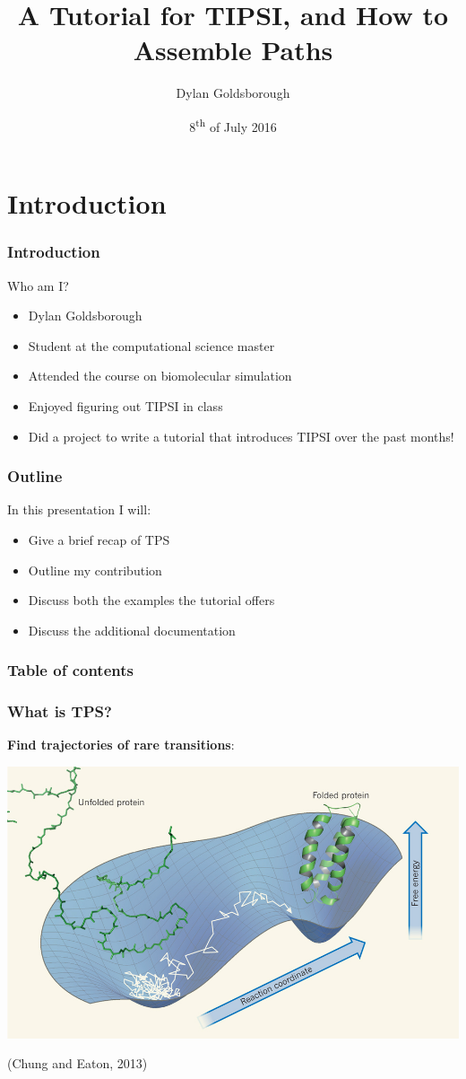 \documentclass[hyperref={pdfpagelabels=false}]{beamer}
\title{A Tutorial for \textsc{TIPSI}, and How to Assemble Paths}
\author{Dylan Goldsborough}
\date{8\textsuperscript{th} of July 2016}
\begin{document}
\begin{frame}
\titlepage
\end{frame} 



\section{Introduction} 
\setcounter{subsection}{1}
\begin{frame}
\frametitle{Introduction}
Who am I?
\begin{itemize}
\item Dylan Goldsborough
\item Student at the computational science master
\item Attended the course on biomolecular simulation
\item Enjoyed figuring out \textsc{TIPSI} in class
\item Did a project to write a tutorial that introduces \textsc{TIPSI} over the past months!
\end{itemize}
\end{frame}

\begin{frame}
\frametitle{Outline}
In this presentation I will:
\begin{itemize}
\item Give a brief recap of TPS
\item Outline my contribution
\item Discuss both the examples the tutorial offers
\item Discuss the additional documentation
\end{itemize} 
\end{frame}

\begin{frame}
\frametitle{Table of contents}
\tableofcontents
\end{frame} 

\begin{frame}
\frametitle{What is TPS?}
\textbf{Find trajectories of rare transitions}:
\begin{center}
\includegraphics[scale=0.3]{images/fold.png}
\end{center}
(Chung and Eaton, 2013)
\end{frame}
\end{document}

